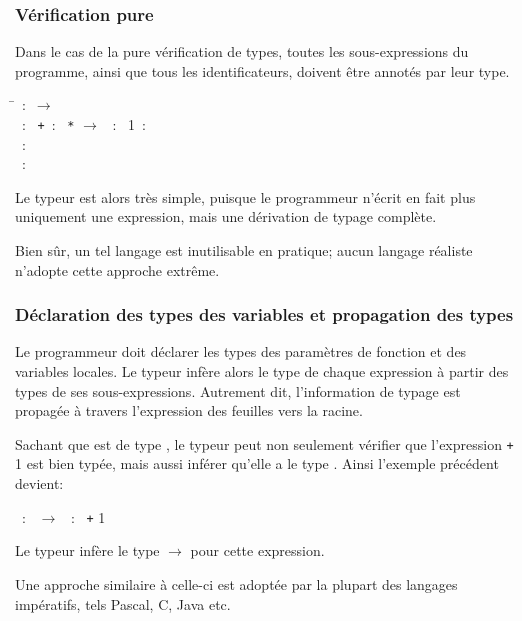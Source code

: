 %
\begin{frame}
\frametitle{Vérification pure}

Dans le cas de la pure vérification de types, toutes les
sous-expressions du programme, ainsi que tous les identificateurs,
doivent être annotés par leur type.

\exemple
{\small
\begin{tabbing}
\Xfun \= \lpar{}~:~\rpar $\rightarrow$ \lpar\\
\> \Xlet {}~:~ \equal \lpar\texttt{+}~:~
\texttt{*}  $\rightarrow$ \rpar{}
\lpar{}~:~\rpar{} \lpar\num{1}~:~\rpar\\
\> \Xin {}~:~\\
\rpar{}~:~
\end{tabbing}
}
Le typeur est alors très simple, puisque le programmeur n'écrit en
fait plus uniquement une expression, mais une dérivation de typage
complète.

\bigskip

Bien sûr, un tel langage est inutilisable en pratique; aucun langage
réaliste n'adopte cette approche extrême.

\end{frame}

%
\begin{frame}
\frametitle{Déclaration des types des variables et propagation des types}

Le programmeur doit déclarer les types des paramètres de fonction et
des variables locales. Le typeur infère alors le type de chaque
expression à partir des types de ses sous-expressions. Autrement dit,
l'information de typage est propagée à travers l'expression des
feuilles vers la racine.

\exemple \quad Sachant que  est de type , le typeur
peut non seulement vérifier que l'expression  \texttt{+} \num{1}
est bien typée, mais aussi inférer qu'elle a le type . Ainsi
l'exemple précédent devient:

\centerline {\small \Xfun \lpar{}~:~\rpar{}
$\rightarrow$ \Xlet {}~:~ \equal {} \texttt{+}
\num{1} \Xin {}}

Le typeur infère le type  $\rightarrow$  pour
cette expression.

Une approche similaire à celle-ci est adoptée par la plupart des
langages impératifs, tels Pascal, C, Java etc.

\end{frame}

